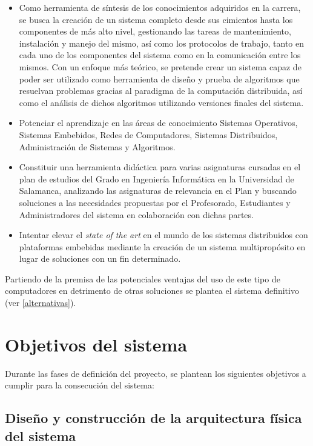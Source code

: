\begin{itemize}
	\item Como herramienta de síntesis de los conocimientos adquiridos en la carrera, se busca la creación de un sistema completo desde sus cimientos hasta los componentes de más alto nivel, gestionando las tareas de mantenimiento, instalación y manejo del mismo, así como los protocolos de trabajo, tanto en cada uno de los componentes del sistema como en la comunicación entre los mismos. Con un enfoque más teórico, se pretende crear un sistema capaz de poder ser utilizado como herramienta de diseño y prueba de algoritmos que resuelvan problemas gracias al paradigma de la computación distribuida, así como el análisis de dichos algoritmos utilizando versiones finales del sistema.

	\item Potenciar el aprendizaje en las áreas de conocimiento Sistemas Operativos, Sistemas Embebidos, Redes de Computadores, Sistemas Distribuidos, Administración de Sistemas y Algoritmos.
	
	\item Constituir una herramienta didáctica para varias asignaturas cursadas en el plan de estudios del Grado en Ingeniería Informática en la Universidad de Salamanca, analizando las asignaturas de relevancia en el Plan y buscando soluciones a las necesidades propuestas por el Profesorado, Estudiantes y Administradores del sistema en colaboración con dichas partes.

	\item Intentar elevar el \textit{state of the art} en el mundo de los sistemas distribuidos con plataformas embebidas mediante la creación de un sistema multipropósito en lugar de soluciones con un fin determinado.

\end{itemize}

Partiendo de la premisa de las potenciales ventajas del uso de este tipo de computadores en detrimento de otras soluciones se plantea el sistema definitivo (ver \ref{alternativas}).

\section{Objetivos del sistema}

Durante las fases de definición del proyecto, se plantean los siguientes objetivos a cumplir para la consecución del sistema:

\subsection{Diseño y construcción de la arquitectura física del sistema}

